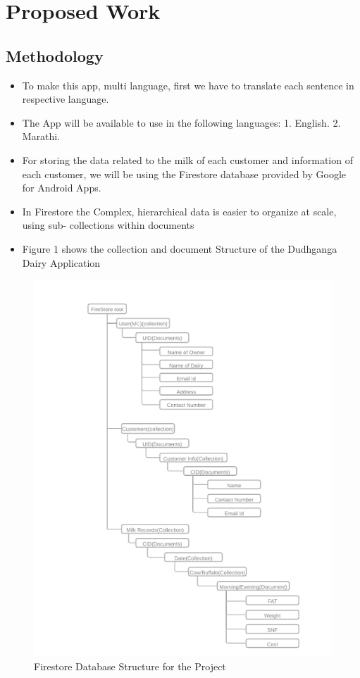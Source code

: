 \documentclass[english]{article}
\begin{document}

\section{Proposed Work} %
\subsection{Methodology}
\begin{itemize}
\item To make this app, multi language, first we have to translate each sentence in respective language.
\item The App will be available to use in the following languages:
1. English.
2. Marathi.
\item For storing the data related to the milk of each customer and information of each customer, we will be using the Firestore database provided by Google for Android Apps.
\item In Firestore the Complex, hierarchical data is easier to organize at scale, using sub- collections within documents
\item Figure 1 shows the collection and document Structure of the Dudhganga Dairy Application
\end{itemize}
\begin{figure}[H]
\centering
\includegraphics[scale=0.5]{database.png}
\caption{Firestore Database Structure for the Project}
\end{figure}
\end{document}
